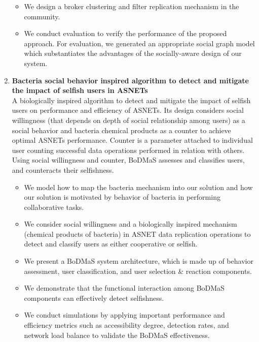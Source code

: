 \begin{enumerate}
\begin{itemize}
            \item We design a broker clustering and filter replication mechanism in the community.
            \item We conduct evaluation to verify the performance of the proposed approach. For evaluation, we generated an appropriate social graph model which substantiates the advantages of the socially-aware design of our system.
\end{itemize}
    \item \textbf{Bacteria social behavior inspired algorithm to detect and mitigate the impact of selfish users in ASNETs}
    \\
    A biologically inspired algorithm to detect and mitigate the impact of selfish users on performance and efficiency of ASNETs. Its design considers social willingness (that depends on depth of social relationship among users) as a social behavior and bacteria chemical products as a counter to achieve optimal ASNETs performance. Counter is a parameter attached to individual user counting successful data operations performed in relation with others. Using social willingness and counter, BoDMaS assesses and classifies users, and counteracts their selfishness.
        \begin{itemize}
            \item We model how to map the bacteria mechanism into our solution and how our solution is motivated by behavior of bacteria in performing collaborative tasks.
            \item We consider social willingness and a biologically inspired mechanism (chemical products of bacteria) in ASNET data replication operations to detect and classify users as either cooperative or selfish.
            \item We present a BoDMaS system architecture, which is made up of behavior assessment, user classification, and user selection \& reaction components.
            \item We demonstrate that the functional interaction among BoDMaS components can effectively detect selfishness.
            \item We conduct simulations by applying important performance and efficiency metrics such as accessibility degree, detection rates, and network load balance to validate the BoDMaS effectiveness.
\end{itemize}
\end{enumerate}

